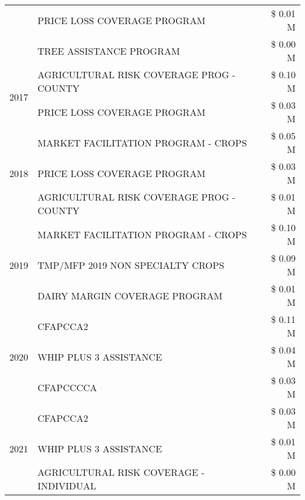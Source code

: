 \begin{tabular}{llr}
 & PRICE LOSS COVERAGE PROGRAM & \$ 0.01 M \\
 & TREE ASSISTANCE PROGRAM & \$ 0.00 M \\
\cline{1-3}
\multirow[t]{2}{*}{2017} & AGRICULTURAL RISK COVERAGE PROG - COUNTY & \$ 0.10 M \\
 & PRICE LOSS COVERAGE PROGRAM & \$ 0.03 M \\
\cline{1-3}
\multirow[t]{3}{*}{2018} & MARKET FACILITATION PROGRAM - CROPS & \$ 0.05 M \\
 & PRICE LOSS COVERAGE PROGRAM & \$ 0.03 M \\
 & AGRICULTURAL RISK COVERAGE PROG - COUNTY & \$ 0.01 M \\
\cline{1-3}
\multirow[t]{3}{*}{2019} & MARKET FACILITATION PROGRAM - CROPS & \$ 0.10 M \\
 & TMP/MFP 2019 NON SPECIALTY CROPS & \$ 0.09 M \\
 & DAIRY MARGIN COVERAGE PROGRAM & \$ 0.01 M \\
\cline{1-3}
\multirow[t]{3}{*}{2020} & CFAPCCA2 & \$ 0.11 M \\
 & WHIP PLUS 3 ASSISTANCE & \$ 0.04 M \\
 & CFAPCCCCA & \$ 0.03 M \\
\cline{1-3}
\multirow[t]{3}{*}{2021} & CFAPCCA2 & \$ 0.03 M \\
 & WHIP PLUS 3 ASSISTANCE & \$ 0.01 M \\
 & AGRICULTURAL RISK COVERAGE - INDIVIDUAL & \$ 0.00 M \\
\cline{1-3}
\bottomrule
\end{tabular}
